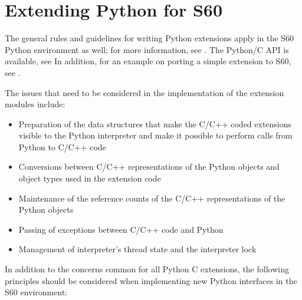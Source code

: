 %
%
%

\section{Extending Python for S60}
\label{extending}
The general rules and guidelines for writing Python extensions apply
in the S60 Python environment as well; for more information, see
\cite{PyExtEmb}.  The Python/C API is available, see \cite{PyCAPI} In
addition, for an example on porting a simple extension to S60, see
\cite{PyS60Prog}.

The issues that need to be considered in the implementation of the
extension modules include:

\begin{itemize}
\item Preparation of the data structures that make the C/C++ coded extensions visible to the Python interpreter and make it possible to perform calls from Python to C/C++ code
\item Conversions between C/C++ representations of the Python objects and object types used in the extension code
\item Maintenance of the reference counts of the C/C++ representations of the Python objects
\item Passing of exceptions between C/C++ code and Python
\item Management of interpreter's thread state and the interpreter lock
\end{itemize}
In addition to the concerns common for all Python C extensions, the 
following principles should be considered when implementing new Python 
interfaces in the S60 environment:

